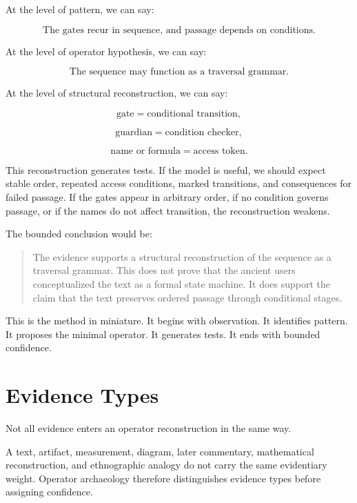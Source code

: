 \documentclass[11pt]{book}
\begin{document}
At the level of pattern, we can say:

\[
\text{The gates recur in sequence, and passage depends on conditions.}
\]

At the level of operator hypothesis, we can say:

\[
\text{The sequence may function as a traversal grammar.}
\]

At the level of structural reconstruction, we can say:

\[
\text{gate} = \text{conditional transition},
\]

\[
\text{guardian} = \text{condition checker},
\]

\[
\text{name or formula} = \text{access token}.
\]

This reconstruction generates tests. If the model is useful, we should expect stable order, repeated access conditions, marked transitions, and consequences for failed passage. If the gates appear in arbitrary order, if no condition governs passage, or if the names do not affect transition, the reconstruction weakens.

The bounded conclusion would be:

\begin{quote}
The evidence supports a structural reconstruction of the sequence as a traversal grammar. This does not prove that the ancient users conceptualized the text as a formal state machine. It does support the claim that the text preserves ordered passage through conditional stages.
\end{quote}

This is the method in miniature. It begins with observation. It identifies pattern. It proposes the minimal operator. It generates tests. It ends with bounded confidence.

\section{Evidence Types}

Not all evidence enters an operator reconstruction in the same way.

A text, artifact, measurement, diagram, later commentary, mathematical reconstruction, and ethnographic analogy do not carry the same evidentiary weight. Operator archaeology therefore distinguishes evidence types before assigning confidence.
\end{document}

